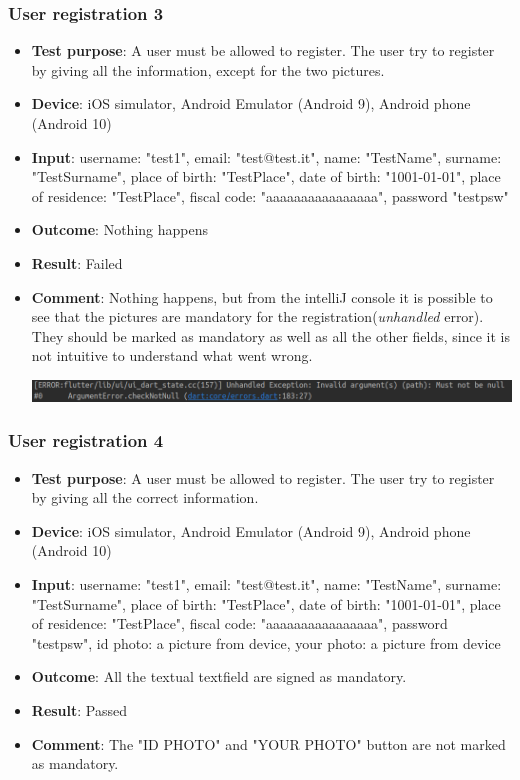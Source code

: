 \documentclass[../ATD.tex]{subfiles}
\begin{document}
    \subsubsection{User registration 3}\label{subsubsec:user-registration-3}
    \begin{itemize}
        \item \textbf{Test purpose}: A user must be allowed to register.
        The user try to register by giving all the information, except for the two pictures.
        \item \textbf{Device}: iOS simulator, Android Emulator (Android 9), Android phone (Android 10)
        \item \textbf{Input}: username: "test1", email: "test@test.it", name: "TestName", surname: "TestSurname", place of birth: "TestPlace", date of birth: "1001-01-01", place of residence: "TestPlace", fiscal code: "aaaaaaaaaaaaaaaa", password "testpsw"
        \item \textbf{Outcome}: Nothing happens
        \item \textbf{Result}: Failed
        \item \textbf{Comment}: Nothing happens, but from the intelliJ console it is possible to see that the pictures are mandatory for the registration(\textit{unhandled} error).
        They should be marked as mandatory as well as all the other fields, since it is not intuitive to understand what went wrong.

        \includegraphics[scale = 0.4]{assets/noPicError.png}
    \end{itemize}

    \subsubsection{User registration 4}\label{subsubsec:user-registration-4}
    \begin{itemize}
        \item \textbf{Test purpose}: A user must be allowed to register.
        The user try to register by giving all the correct information.
        \item \textbf{Device}: iOS simulator, Android Emulator (Android 9), Android phone (Android 10)
        \item \textbf{Input}: username: "test1", email: "test@test.it", name: "TestName", surname: "TestSurname", place of birth: "TestPlace", date of birth: "1001-01-01", place of residence: "TestPlace", fiscal code: "aaaaaaaaaaaaaaaa", password "testpsw", id photo: a picture from device, your photo: a picture from device
        \item \textbf{Outcome}: All the textual textfield are signed as mandatory.
        \item \textbf{Result}: Passed
        \item \textbf{Comment}: The "ID PHOTO" and "YOUR PHOTO" button are not marked as mandatory.
    \end{itemize}
\end{document}
